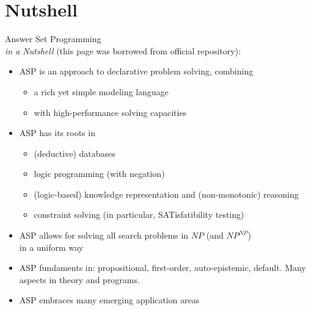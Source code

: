\documentclass{beamer}
\begin{document}
\section{Nutshell}
\begin{frame}{Answer Set Programming\\[-2pt]{\small\emph{in a Nutshell}  (this page was borrowed from official repository):} }
  \begin{itemize}
  \item <2->
    ASP is an approach to \alert{declarative problem solving},   combining
    \begin{itemize}
    \item a rich yet simple modeling language
    \item with high-performance solving capacities
    \end{itemize}
  \item <3-> ASP has its roots in
    \begin{itemize}
    \item (deductive) databases
    \item logic programming (with negation)
    \item (logic-based) knowledge representation and (non-monotonic) reasoning
    \item constraint solving (in particular, SATisfatibility testing)
    \end{itemize}
  \item <4-6>
    ASP allows for solving all search problems in $NP$ (and $NP^{NP}$)
    \\in a uniform way %
  \item <5-6>
    ASP fundaments in: propositional, first-order, auto-epistemic, default. Many aspects in theory and programs.
  \item <6-6> ASP embraces many emerging application areas
  \end{itemize}
\end{frame}
\end{document}
